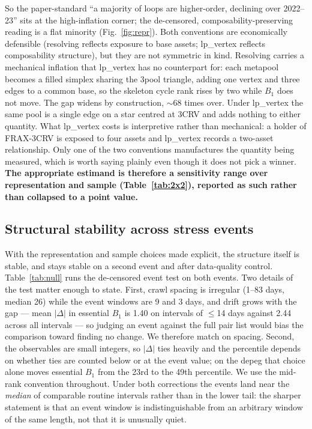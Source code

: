 \documentclass[10pt,twocolumn]{article}
\begin{document}
So the paper-standard ``a majority of loops are higher-order, declining over 2022--23''
sits at the high-inflation corner; the de-censored, composability-preserving reading is a
flat minority (Fig.~\ref{fig:repr}). Both conventions are economically defensible
(resolving reflects exposure to base assets; lp\_vertex reflects composability structure),
but they are not symmetric in kind. Resolving carries a mechanical inflation that
lp\_vertex has no counterpart for: each metapool becomes a filled simplex sharing the 3pool
triangle, adding one vertex and three edges to a common base, so the skeleton cycle rank
rises by two while $B_1$ does not move. The gap widens by construction, $\sim$68 times
over. Under lp\_vertex the same pool is a single edge on a star centred at 3CRV and adds
nothing to either quantity. What lp\_vertex costs is interpretive rather than mechanical:
a holder of FRAX-3CRV is exposed to four assets and lp\_vertex records a two-asset
relationship. Only one of the two conventions manufactures the quantity being measured,
which is worth saying plainly even though it does not pick a winner.
\textbf{The appropriate estimand is therefore a sensitivity range over representation and
sample (Table~\ref{tab:2x2}), reported as such rather than collapsed to a point value.}

\subsection{Structural stability across stress events}
\label{sec:null}

With the representation and sample choices made explicit, the structure itself is stable,
and stays stable on a second event and after data-quality control. Table~\ref{tab:null} runs the de-censored event test on
both events. Two details of the test matter enough to state. First, crawl spacing is
irregular (1--83 days, median 26) while the event windows are 9 and 3 days, and drift grows
with the gap --- mean $|\Delta|$ in essential $B_1$ is 1.40 on intervals of $\le$14 days
against 2.44 across all intervals --- so judging an event against the full pair list would
bias the comparison toward finding no change. We therefore match on spacing. Second, the
observables are small integers, so $|\Delta|$ ties heavily and the percentile depends on
whether ties are counted below or at the event value; on the depeg that choice alone moves
essential $B_1$ from the 23rd to the 49th percentile. We use the mid-rank convention
throughout. Under both corrections the events land near the \emph{median} of comparable
routine intervals rather than in the lower tail: the sharper statement is that an event
window is indistinguishable from an arbitrary window of the same length, not that it is
unusually quiet.
\end{document}
